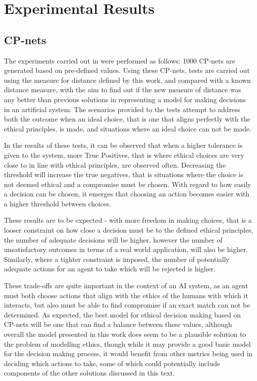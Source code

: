 \documentclass{svproc}
\begin{document}
\section{Experimental Results}
\subsection{CP-nets}
\par 
The experiments carried out in \cite{loreggia} were performed as follows: 1000 CP-nets are generated based on pre-defined values. Using these CP-nets, tests are carried out using the measure for distance defined by this work, and compared with a known distance measure, with the aim to find out if the new measure of distance was any better than previous solutions in representing a model for making decisions in an artificial system. The scenarios provided to the tests attempt to address both the outcome when an ideal choice, that is one that aligns perfectly with the ethical principles, is made, and situations where an ideal choice can not be made.
\par
In the results of these tests, it can be observed that when a higher tolerance is given to the system, more True Positives, that is where ethical choices are very close to in line with ethical principles, are observed often. Decreasing the threshold will increase the true negatives, that is situations where the choice is not deemed ethical and a compromise must be chosen. With regard to how easily a decision can be chosen, it emerges that choosing an action becomes easier with a higher threshold between choices.
\par
These results are to be expected - with more freedom in making choices, that is a looser constraint on how close a decision must be to the defined ethical principles, the number of adequate decisions will be higher, however the number of unsatisfactory outcomes in terms of a real world application, will also be higher. Similarly, where a tighter constraint is imposed, the number of potentially adequate actions for an agent to take which will be rejected is higher.
\par
These trade-offs are quite important in the context of an AI system, as an agent must both choose actions that align with the ethics of the humans with which it interacts, but also must be able to find compromise if an exact match can not be determined. As expected, the best model for ethical decision making based on CP-nets will be one that can find a balance between these values, although overall the model presented in this work does seem to be a plausible solution to the problem of modelling ethics, though while it may provide a good basic model for the decision making process, it would benefit from other metrics being used in deciding which actions to take, some of which could potentially include components of the other solutions discussed in this text.
\end{document}
